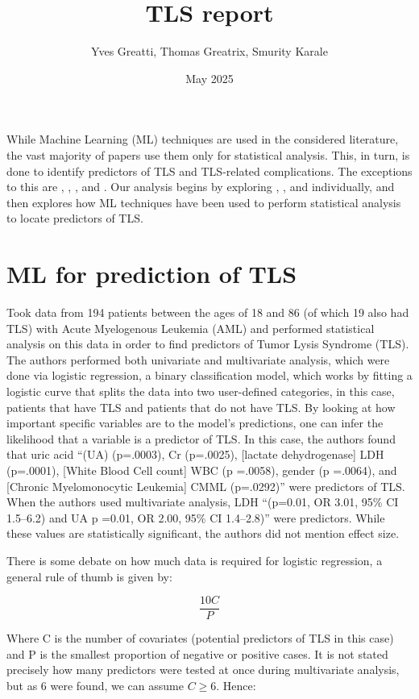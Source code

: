 \documentclass{article}
\title{TLS report}
\author{Yves Greatti, Thomas Greatrix, Smurity Karale}
\date{May 2025}
\begin{document}
\maketitle

While Machine Learning (ML) techniques are used in the considered literature, the vast majority of papers use them only for statistical analysis. This, in turn, is done to identify predictors of TLS and TLS-related complications. The exceptions to this are ,  \cite{montesinos2008tumor}, \cite{mato2004predictive}, and  \cite{xiao2024prediction}. Our analysis begins by exploring \cite{montesinos2008tumor}, 
\cite{xiao2024prediction}, and  \cite{mato2004predictive} individually, and then explores how ML techniques have been used to perform statistical analysis to locate predictors of TLS.

\section{ML for prediction of TLS}

\cite{montesinos2008tumor} Took data from 194 patients between the ages of 18 and 86 (of which 19 also had TLS) with Acute Myelogenous Leukemia (AML) and performed statistical analysis on this data in order to find predictors of Tumor Lysis Syndrome (TLS). The authors performed both univariate and multivariate analysis, which were done via logistic regression, a binary classification model, which works by fitting a logistic curve that splits the data into two user-defined categories, in this case, patients that have TLS and patients that do not have TLS. By looking at how important specific variables are to the model’s predictions, one can infer the likelihood that a variable is a predictor of TLS. In this case, the authors found that uric acid “(UA) (p=.0003), Cr (p=.0025), [lactate dehydrogenase] LDH (p=.0001), [White Blood Cell count] WBC (p =.0058), gender (p =.0064), and [Chronic Myelomonocytic Leukemia] CMML (p=.0292)” were predictors of TLS. When the authors used multivariate analysis, LDH “(p=0.01, OR 3.01, 95\% CI 1.5–6.2) and UA p =0.01, OR 2.00, 95\% CI 1.4–2.8)” were predictors. While these values are statistically significant, the authors did not mention effect size.

There is some debate on how much data is required for logistic regression, a general rule of thumb is given by:

\[\frac{10C}{P}\]

Where C is the number of covariates (potential predictors of TLS in this case) and P is the smallest proportion of negative or positive cases. It is not stated precisely how many predictors were tested at once during multivariate analysis, but as 6 were found, we can assume \(C \geq 6\). Hence:
\end{document}
